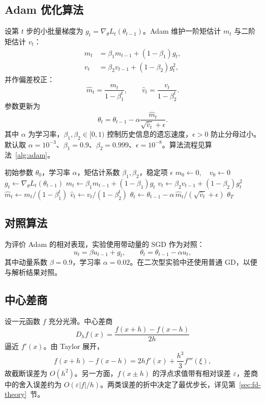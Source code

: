 \documentclass[12pt,a4paper]{ctexart}
\begin{document}
\subsection{Adam 优化算法}
设第 $t$ 步的小批量梯度为 $g_t=\nabla_\theta L_t(\theta_{t-1})$。Adam 维护一阶矩估计 $m_t$ 与二阶矩估计 $v_t$：
\begin{align}
m_t &= \beta_1 m_{t-1}+(1-\beta_1)g_t,\\
v_t &= \beta_2 v_{t-1}+(1-\beta_2)g_t^2,
\end{align}
并作偏差校正：
\begin{equation}
\hat m_t=\frac{m_t}{1-\beta_1^t},\qquad
\hat v_t=\frac{v_t}{1-\beta_2^t}.
\end{equation}
参数更新为
\begin{equation}
\theta_t=\theta_{t-1}-\alpha\frac{\hat m_t}{\sqrt{\hat v_t}+\epsilon}.
\label{eq:adam}
\end{equation}
其中 $\alpha$ 为学习率，$\beta_1,\beta_2\in[0,1)$ 控制历史信息的遗忘速度，$\epsilon>0$ 防止分母过小。默认取 $\alpha=10^{-3}$、$\beta_1=0.9$、$\beta_2=0.999$、$\epsilon=10^{-8}$。算法流程见算法~\ref{alg:adam}。

\begin{algorithm}[H]
\caption{Adam 优化算法}
\label{alg:adam}
\begin{algorithmic}[1]
\Require 初始参数 $\theta_0$，学习率 $\alpha$，矩估计系数 $\beta_1,\beta_2$，稳定项 $\epsilon$
\State $m_0\gets 0,\quad v_0\gets 0$
  \State $g_t\gets \nabla_\theta L_t(\theta_{t-1})$
  \State $m_t\gets \beta_1 m_{t-1}+(1-\beta_1)g_t$
  \State $v_t\gets \beta_2 v_{t-1}+(1-\beta_2)g_t^2$
  \State $\hat m_t\gets m_t/(1-\beta_1^t)$
  \State $\hat v_t\gets v_t/(1-\beta_2^t)$
  \State $\theta_t\gets \theta_{t-1}-\alpha\,\hat m_t/(\sqrt{\hat v_t}+\epsilon)$
\EndFor
\State \Return $\theta_T$
\end{algorithmic}
\end{algorithm}

\subsection{对照算法}
为评价 Adam 的相对表现，实验使用带动量的 SGD 作为对照：
\begin{equation}
u_t=\beta u_{t-1}+g_t,\qquad
\theta_t=\theta_{t-1}-\alpha u_t,
\end{equation}
其中动量系数 $\beta=0.9$，学习率 $\alpha=0.02$。在二次型实验中还使用普通 GD，以便与解析结果对照。

\subsection{中心差商}
设一元函数 $f$ 充分光滑。中心差商
\begin{equation}
D_h f(x)=\frac{f(x+h)-f(x-h)}{2h}
\label{eq:central}
\end{equation}
逼近 $f'(x)$。由 Taylor 展开，
\begin{equation}
f(x+h)-f(x-h)=2hf'(x)+\frac{h^3}{3}f'''(\xi),
\end{equation}
故截断误差为 $O(h^2)$。另一方面，$f(x\pm h)$ 的浮点求值带有相对误差 $\varepsilon$，差商中的舍入误差约为 $O(\varepsilon |f|/h)$。两类误差的折中决定了最优步长，详见第~\ref{sec:fd-theory}~节。
\end{document}
